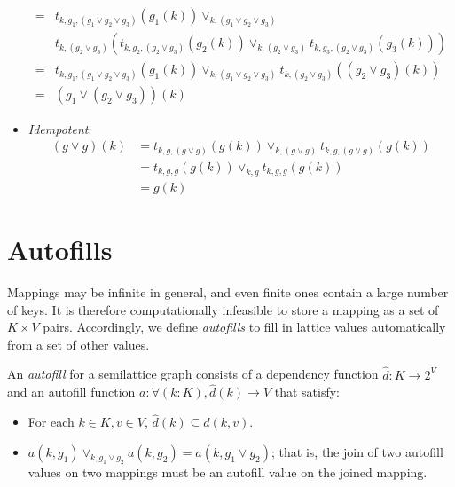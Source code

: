 \documentclass{article}
\begin{document}
\begin{itemize}
\begin{align*}
              =& t_{k, g_1, (g_1 \vee g_2 \vee g_3)}(g_1(k)) \vee_{k, (g_1 \vee g_2 \vee g_3)} \\
               & t_{k, (g_2 \vee g_3)}(t_{k, g_2, (g_2 \vee g_3)}(g_2(k)) \vee_{k, (g_2 \vee g_3)} t_{k, g_3, (g_2 \vee g_3)}(g_3(k))) \\
              =& t_{k, g_1, (g_1 \vee g_2 \vee g_3)}(g_1(k)) \vee_{k, (g_1 \vee g_2 \vee g_3)} t_{k, (g_2 \vee g_3)}((g_2 \vee g_3)(k)) \\
              =& (g_1 \vee (g_2 \vee g_3))(k)
            \end{align*}
          \item \emph{Idempotent}:
            \begin{align*}
              (g \vee g)(k) &= t_{k, g, (g \vee g)}(g(k)) \vee_{k, (g \vee g)} t_{k, g, (g \vee g)}(g(k)) \\
              &= t_{k, g, g}(g(k)) \vee_{k, g} t_{k, g, g}(g(k)) \\
              &= g(k)
            \end{align*}
        \end{itemize}

    \section{Autofills}

        Mappings may be infinite in general, and even finite ones contain a large number of keys. It is therefore computationally infeasible to store a mapping as a set of $K \times V$ pairs. Accordingly, we define \emph{autofills} to fill in lattice values automatically from a set of other values.




        An \emph{autofill} for a semilattice graph consists of a dependency function $\hat{d}: K \rightarrow 2^V$ and an autofill function $a : \forall (k:K), \hat{d}(k) \rightarrow V$ that satisfy:

        \begin{itemize}
          \item
            For each $k \in K, v \in V$, $\hat{d}(k) \subseteq d(k, v)$.
          \item
            $a(k, g_1) \vee_{k, g_1 \vee g_2} a(k, g_2) = a(k, g_1 \vee g_2)$; that is, the join of two autofill values on two mappings must be an autofill value on the joined mapping.
        \end{itemize}
\end{document}
